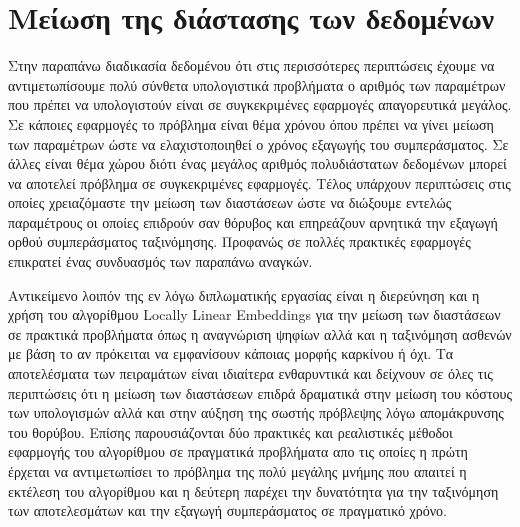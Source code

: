 \section{Μείωση της διάστασης των δεδομένων}
\par
Στην παραπάνω διαδικασία δεδομένου ότι στις περισσότερες περιπτώσεις έχουμε να αντιμετωπίσουμε πολύ σύνθετα υπολογιστικά προβλήματα ο αριθμός των παραμέτρων που πρέπει να υπολογιστούν είναι σε συγκεκριμένες εφαρμογές απαγορευτικά μεγάλος. Σε κάποιες εφαρμογές το πρόβλημα είναι θέμα χρόνου όπου πρέπει να γίνει μείωση των παραμέτρων ώστε να ελαχιστοποιηθεί ο χρόνος εξαγωγής του συμπεράσματος. Σε άλλες είναι θέμα χώρου διότι ένας μεγάλος αριθμός πολυδιάστατων δεδομένων μπορεί να αποτελεί πρόβλημα σε συγκεκριμένες εφαρμογές. Τέλος υπάρχουν περιπτώσεις στις οποίες χρειαζόμαστε την μείωση των διαστάσεων ώστε να διώξουμε εντελώς παραμέτρους οι οποίες επιδρούν σαν θόρυβος και επηρεάζουν αρνητικά την εξαγωγή ορθού συμπεράσματος ταξινόμησης. Προφανώς σε πολλές πρακτικές εφαρμογές επικρατεί ένας συνδυασμός των παραπάνω αναγκών.
\par
Αντικείμενο λοιπόν της εν λόγω διπλωματικής εργασίας είναι η διερεύνηση και η χρήση του αλγορίθμου \textlatin{Locally Linear Embeddings} για την μείωση των διαστάσεων σε πρακτικά προβλήματα όπως η αναγνώριση ψηφίων αλλά και η ταξινόμηση ασθενών με βάση το αν πρόκειται να εμφανίσουν κάποιας μορφής καρκίνου ή όχι. Τα αποτελέσματα των πειραμάτων είναι ιδιαίτερα ενθαρυντικά και δείχνουν σε όλες τις περιπτώσεις ότι η μείωση των διαστάσεων επιδρά δραματικά στην μείωση του κόστους των υπολογισμών αλλά και στην αύξηση της σωστής πρόβλεψης λόγω απομάκρυνσης του θορύβου. Επίσης παρουσιάζονται δύο πρακτικές και ρεαλιστικές μέθοδοι εφαρμογής του αλγορίθμου σε πραγματικά προβλήματα απο τις οποίες η πρώτη έρχεται να αντιμετωπίσει το πρόβλημα της πολύ μεγάλης μνήμης που απαιτεί η εκτέλεση του αλγορίθμου και η δεύτερη παρέχει την δυνατότητα για την ταξινόμηση των αποτελεσμάτων και την εξαγωγή συμπεράσματος σε πραγματικό χρόνο. 


